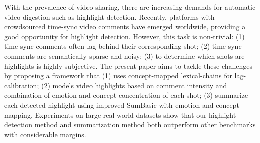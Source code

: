 With the prevalence of video sharing, there are increasing demands for automatic video digestion such as highlight detection. Recently, platforms with crowdsourced time-sync video comments have emerged worldwide, providing a good opportunity for highlight detection. However, this task is non-trivial: (1) time-sync comments often lag behind their corresponding shot; (2) time-sync comments are semantically sparse and noisy; (3) to determine which shots are highlights is highly subjective. The present paper aims to tackle these challenges by proposing a framework that (1) uses concept-mapped lexical-chains for lag-calibration; (2) models video highlights based on comment intensity and combination of emotion and concept concentration of each shot; (3) summarize each detected highlight using improved SumBasic with emotion and concept mapping. Experiments on large real-world datasets show that our highlight detection method and summarization method both outperform other benchmarks with considerable margins.
